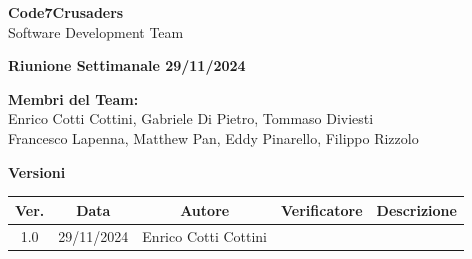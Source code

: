 \documentclass{article}
\begin{document}
\begin{titlepage}
    {\Huge \textbf{Code7Crusaders}}\\
    \vspace{0.5cm}
    {\Large Software Development Team}\\
    \vspace{2cm}
    
    {\large \textbf{Riunione Settimanale 29/11/2024}}\\ 
    \vspace{5cm}                           
    
    
    \textbf{Membri del Team:}\\
    Enrico Cotti Cottini, Gabriele Di Pietro, Tommaso Diviesti \\
    Francesco Lapenna, Matthew Pan, Eddy Pinarello, Filippo Rizzolo \\
    \vspace{0.5cm}
    
    \vspace{1cm}
\end{titlepage}



\newpage
\begin{table}[h!]
\centering
\textbf{Versioni} \\ %
\vspace{2mm} %
\begin{tabular}{|c|c|c|c|c|}
    \hline
    \textbf{Ver.} & \textbf{Data} & \textbf{Autore} & \textbf{Verificatore} & \textbf{Descrizione} \\
    \hline
    1.0 & 29/11/2024 & Enrico Cotti Cottini &  &  \\ 
    \hline                                  
\end{tabular}
\end{table}



\newpage
\tableofcontents



\newpage
\end{document}
